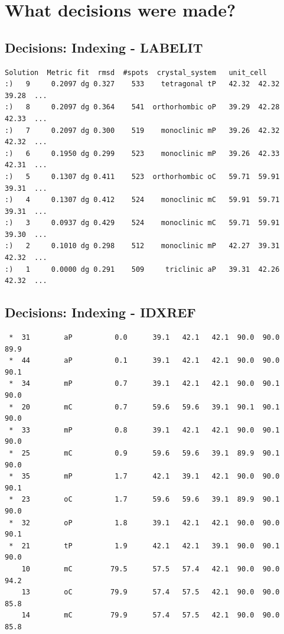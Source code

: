 \documentclass[a4paper, 11pt]{article}
\begin{document}
\section{What decisions were made?}

\subsection{Decisions: Indexing - LABELIT}
{\small
\begin{verbatim}
Solution  Metric fit  rmsd  #spots  crystal_system   unit_cell 
:)   9     0.2097 dg 0.327    533    tetragonal tP   42.32  42.32  39.28  ...
:)   8     0.2097 dg 0.364    541  orthorhombic oP   39.29  42.28  42.33  ...
:)   7     0.2097 dg 0.300    519    monoclinic mP   39.26  42.32  42.32  ...
:)   6     0.1950 dg 0.299    523    monoclinic mP   39.26  42.33  42.31  ...
:)   5     0.1307 dg 0.411    523  orthorhombic oC   59.71  59.91  39.31  ...
:)   4     0.1307 dg 0.412    524    monoclinic mC   59.91  59.71  39.31  ...
:)   3     0.0937 dg 0.429    524    monoclinic mC   59.71  59.91  39.30  ...
:)   2     0.1010 dg 0.298    512    monoclinic mP   42.27  39.31  42.32  ...
:)   1     0.0000 dg 0.291    509     triclinic aP   39.31  42.26  42.32  ...
\end{verbatim}
}

\subsection{Decisions: Indexing - IDXREF}
{\small
\begin{verbatim}
 *  31        aP          0.0      39.1   42.1   42.1  90.0  90.0  89.9
 *  44        aP          0.1      39.1   42.1   42.1  90.0  90.0  90.1
 *  34        mP          0.7      39.1   42.1   42.1  90.0  90.1  90.0
 *  20        mC          0.7      59.6   59.6   39.1  90.1  90.1  90.0
 *  33        mP          0.8      39.1   42.1   42.1  90.0  90.1  90.0
 *  25        mC          0.9      59.6   59.6   39.1  89.9  90.1  90.0
 *  35        mP          1.7      42.1   39.1   42.1  90.0  90.0  90.1
 *  23        oC          1.7      59.6   59.6   39.1  89.9  90.1  90.0
 *  32        oP          1.8      39.1   42.1   42.1  90.0  90.0  90.1
 *  21        tP          1.9      42.1   42.1   39.1  90.0  90.1  90.0
    10        mC         79.5      57.5   57.4   42.1  90.0  90.0  94.2
    13        oC         79.9      57.4   57.5   42.1  90.0  90.0  85.8
    14        mC         79.9      57.4   57.5   42.1  90.0  90.0  85.8
\end{verbatim}
}
\end{document}
